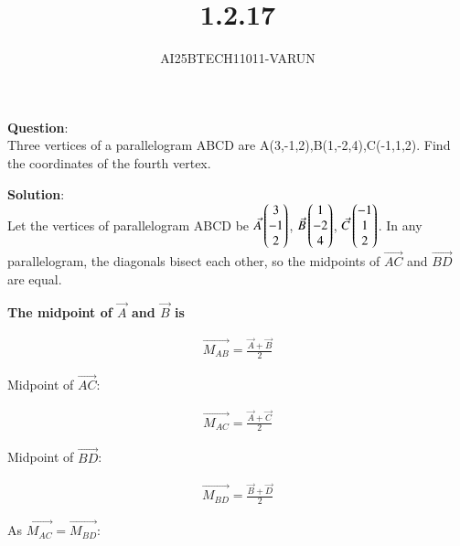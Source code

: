 \documentclass[journal]{IEEEtran}
\begin{document}

\vspace{3cm}

\title{1.2.17}
\author{AI25BTECH11011-VARUN}
 \maketitle
{\let\newpage\relax\maketitle}

\renewcommand{\thefigure}{\theenumi}
\renewcommand{\thetable}{\theenumi}
\setlength{\intextsep}{10pt} %


\renewcommand{\thetable}{\theenumi}
\textbf{Question}:\\
Three vertices of a parallelogram ABCD are A(3,-1,2),B(1,-2,4),C(-1,1,2). Find the coordinates of the fourth vertex.

\textbf{Solution}:\\
Let the vertices of parallelogram ABCD be
$\Vec{A}\begin{pmatrix}3\\-1\\2\end{pmatrix}$, $\Vec{ B}\begin{pmatrix}1\\-2\\4\end{pmatrix}$, $\Vec{C}\begin{pmatrix}-1\\1\\2\end{pmatrix}$.
In any parallelogram, the diagonals bisect each other, so the midpoints of $\vec{AC}$ and $\vec{BD}$ are equal.

\textbf{The  midpoint of $\vec{A}$ and $\vec{B}$ is}

\begin{align}
    \vec{M_{AB}} = \frac{\vec{A}+\vec{B}}{2}
\end{align}

Midpoint of $\vec{AC}$:

\begin{align}
    \vec{M_{AC}} = \frac{\vec{A}+\vec{C}}{2}
\end{align}

Midpoint of $\vec{BD}$:

\begin{align}
    \vec{M_{BD}} = \frac{\vec{B}+\vec{D}}{2}
\end{align}

As $\vec{M_{AC}}=\vec{M_{BD}}$:
\end{document}
